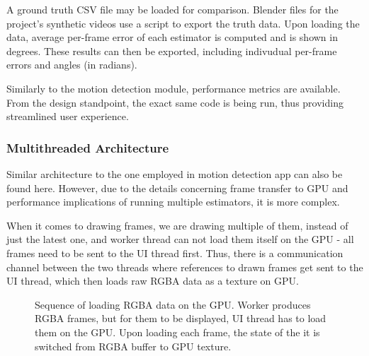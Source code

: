 \documentclass[11pt,english]{report}
\begin{document}
A ground truth CSV file may be loaded for comparison. Blender files for the project's synthetic videos use a script to export the truth data. Upon loading the data, average per-frame error of each estimator is computed and is shown in degrees. These results can then be exported, including indivudual per-frame errors and angles (in radians).

Similarly to the motion detection module, performance metrics are available. From the design standpoint, the exact same code is being run, thus providing streamlined user experience.

\subsubsection{Multithreaded Architecture}

Similar architecture to the one employed in motion detection app can also be found here. However, due to the details concerning frame transfer to GPU and performance implications of running multiple estimators, it is more complex.

When it comes to drawing frames, we are drawing multiple of them, instead of just the latest one, and worker thread can not load them itself on the GPU - all frames need to be sent to the UI thread first. Thus, there is a communication channel between the two threads where references to drawn frames get sent to the UI thread, which then loads raw RGBA data as a texture on GPU.

\begin{figure}[!ht]
	\centering
	\caption{\centering Sequence of loading RGBA data on the GPU. Worker produces RGBA frames, but for them to be displayed, UI thread has to load them on the GPU. Upon loading each frame, the state of the it is switched from RGBA buffer to GPU texture.}
\end{figure}
\end{document}
